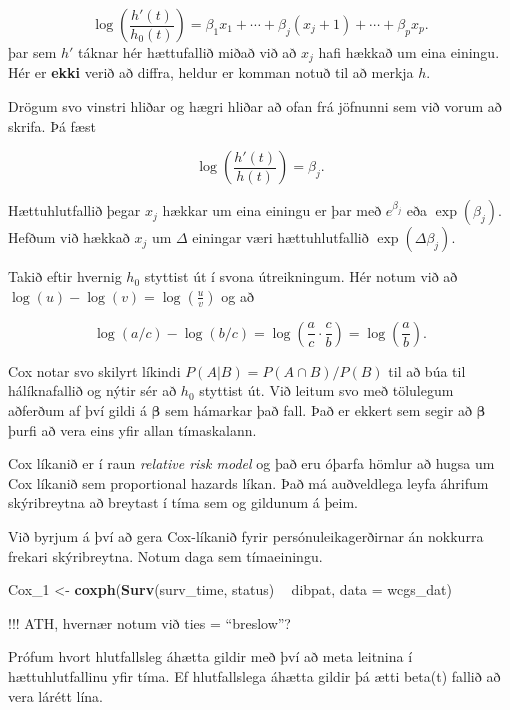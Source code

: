 \documentclass[
]{book}
\newenvironment{Shaded}{\begin{snugshade}}{\end{snugshade}}
\newcommand{\DataTypeTok}[1]{\textcolor[rgb]{0.13,0.29,0.53}{#1}}
\newcommand{\DecValTok}[1]{\textcolor[rgb]{0.00,0.00,0.81}{#1}}
\newcommand{\KeywordTok}[1]{\textcolor[rgb]{0.13,0.29,0.53}{\textbf{#1}}}
\newcommand{\NormalTok}[1]{#1}
\newcommand{\OperatorTok}[1]{\textcolor[rgb]{0.81,0.36,0.00}{\textbf{#1}}}
\newcommand{\StringTok}[1]{\textcolor[rgb]{0.31,0.60,0.02}{#1}}
\begin{document}
\[
\log \left( \frac{h'(t)}{h_0(t)} \right) = \beta_1 x_1 + \cdots + \beta_j ( x_j+1) + \cdots + \beta_p x_p.
\]
þar sem \(h'\) táknar hér hættufallið miðað við að \(x_j\) hafi hækkað um eina einingu. Hér er \textbf{ekki} verið að diffra, heldur er komman notuð til að merkja \(h\).

Drögum svo vinstri hliðar og hægri hliðar að ofan frá jöfnunni sem við vorum að skrifa. Þá fæst

\[
\log \left( \frac{h'(t)}{h(t)} \right) = \beta_j.
\]

Hættuhlutfallið þegar \(x_j\) hækkar um eina einingu er þar með \(e^{\beta_j}\) eða \(\exp(\beta_j)\). Hefðum við hækkað \(x_j\) um \(\Delta\) einingar væri hættuhlutfallið \(\exp(\Delta \beta_j)\).

Takið eftir hvernig \(h_0\) styttist út í svona útreikningum. Hér notum við að \(\log(u) - \log(v) = \log(\frac{u}{v})\) og að

\[
\log(a/c) - \log(b/c) = \log \left(\frac{a}{c} \cdot  \frac{c}{b} \right) = \log \left(\frac{a}{b} \right).  
\]

Cox notar svo skilyrt líkindi \(P(A|B) = P(A \cap B) / P(B)\) til að búa til hálíknafallið og nýtir sér að \(h_0\) styttist út. Við leitum svo með tölulegum aðferðum af því gildi á \(\boldsymbol{\beta}\) sem hámarkar það fall. Það er ekkert sem segir að \(\boldsymbol{\beta}\) þurfi að vera eins yfir allan tímaskalann.

Cox líkanið er í raun \emph{relative risk model} og það eru óþarfa hömlur að hugsa um Cox líkanið sem proportional hazards líkan. Það má auðveldlega leyfa áhrifum skýribreytna að breytast í tíma sem og gildunum á þeim.

Við byrjum á því að gera Cox-líkanið fyrir persónuleikagerðirnar án nokkurra frekari skýribreytna. Notum daga sem tímaeiningu.

\begin{Shaded}
\begin{Highlighting}[]
\NormalTok{Cox_}\DecValTok{1}\NormalTok{ <-}\StringTok{ }\KeywordTok{coxph}\NormalTok{(}\KeywordTok{Surv}\NormalTok{(surv_time, status) }\OperatorTok{~}\StringTok{ }\NormalTok{dibpat, }\DataTypeTok{data =}\NormalTok{ wcgs_dat)}
\end{Highlighting}
\end{Shaded}

!!! ATH, hvernær notum við ties = ``breslow''?

Prófum hvort hlutfallsleg áhætta gildir með því að meta leitnina í hættuhlutfallinu yfir tíma. Ef hlutfallslega áhætta gildir þá ætti beta(t) fallið að vera lárétt lína.
\end{document}
